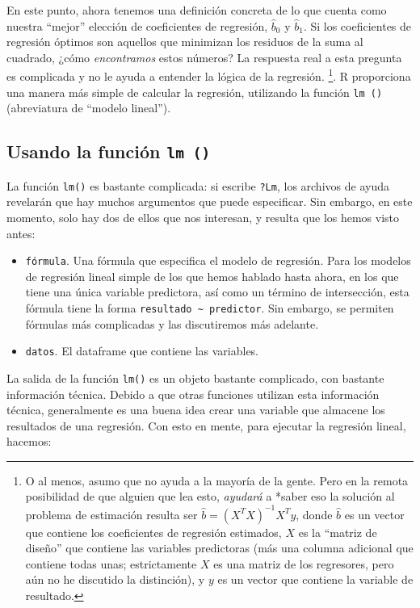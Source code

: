 \documentclass[
]{book}
\providecommand{\tightlist}{%
  \setlength{\itemsep}{0pt}\setlength{\parskip}{0pt}}
\begin{document}
En este punto, ahora tenemos una definición concreta de lo que cuenta como nuestra ``mejor'' elección de coeficientes de regresión, \(\hat{b}_0\) y \(\hat{b}_1\). Si los coeficientes de regresión óptimos son aquellos que minimizan los residuos de la suma al cuadrado, ¿cómo \emph{encontramos} estos números? La respuesta real a esta pregunta es complicada y no le ayuda a entender la lógica de la regresión. \footnote{O al menos, asumo que no ayuda a la mayoría de la gente. Pero en la remota posibilidad de que alguien que lea esto, \emph{ayudará} a *saber eso la solución al problema de estimación resulta ser \(\hat{b}=(X^TX)^{-1}X^T y\), donde \(\hat{b}\) es un vector que contiene los coeficientes de regresión estimados, \(X\) es la ``matriz de diseño'' que contiene las variables predictoras (más una columna adicional que contiene todas unas; estrictamente \(X\) es una matriz de los regresores, pero aún no he discutido la distinción), y \(y\) es un vector que contiene la variable de resultado.}. R proporciona una manera más simple de calcular la regresión, utilizando la función \texttt{lm\ ()} (abreviatura de ``modelo lineal'').

\hypertarget{lm}{%
\subsection{\texorpdfstring{Usando la función \texttt{lm\ ()}}{Usando la función lm ()}}\label{lm}}

La función \texttt{lm()} es bastante complicada: si escribe \texttt{?Lm}, los archivos de ayuda revelarán que hay muchos argumentos que puede especificar. Sin embargo, en este momento, solo hay dos de ellos que nos interesan, y resulta que los hemos visto antes:

\begin{itemize}
\tightlist
\item
  \texttt{fórmula}. Una fórmula que especifica el modelo de regresión. Para los modelos de regresión lineal simple de los que hemos hablado hasta ahora, en los que tiene una única variable predictora, así como un término de intersección, esta fórmula tiene la forma \texttt{resultado\ \textasciitilde{}\ predictor}. Sin embargo, se permiten fórmulas más complicadas y las discutiremos más adelante.
\item
  \texttt{datos}. El dataframe que contiene las variables.
\end{itemize}

La salida de la función \texttt{lm()} es un objeto bastante complicado, con bastante información técnica. Debido a que otras funciones utilizan esta información técnica, generalmente es una buena idea crear una variable que almacene los resultados de una regresión. Con esto en mente, para ejecutar la regresión lineal, hacemos:
\end{document}
